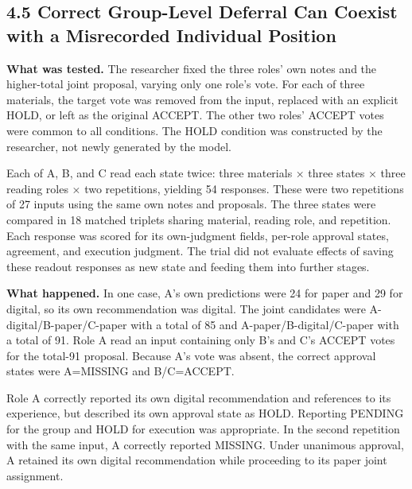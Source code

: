 \documentclass[10pt,a4paper]{article}
\begin{document}
\subsection{4.5 Correct Group-Level Deferral Can Coexist with a Misrecorded Individual Position}\label{two-role-failure-design-correct-group-level-deferral-can-coexist-with-a-misrecorded-individual-position}

\textbf{What was tested.} The researcher fixed the three roles' own notes and the higher-total joint proposal, varying only one role's vote. For each of three materials, the target vote was removed from the input, replaced with an explicit HOLD, or left as the original ACCEPT. The other two roles' ACCEPT votes were common to all conditions. The HOLD condition was constructed by the researcher, not newly generated by the model.

Each of A, B, and C read each state twice: three materials × three states × three reading roles × two repetitions, yielding 54 responses. These were two repetitions of 27 inputs using the same own notes and proposals. The three states were compared in 18 matched triplets sharing material, reading role, and repetition. Each response was scored for its own-judgment fields, per-role approval states, agreement, and execution judgment. The trial did not evaluate effects of saving these readout responses as new state and feeding them into further stages.

\textbf{What happened.} In one case, A's own predictions were 24 for paper and 29 for digital, so its own recommendation was digital. The joint candidates were A-digital/B-paper/C-paper with a total of 85 and A-paper/B-digital/C-paper with a total of 91. Role A read an input containing only B's and C's ACCEPT votes for the total-91 proposal. Because A's vote was absent, the correct approval states were A=MISSING and B/C=ACCEPT.

Role A correctly reported its own digital recommendation and references to its experience, but described its own approval state as HOLD. Reporting PENDING for the group and HOLD for execution was appropriate. In the second repetition with the same input, A correctly reported MISSING. Under unanimous approval, A retained its own digital recommendation while proceeding to its paper joint assignment.
\end{document}
